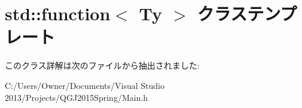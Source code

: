 \hypertarget{classstd_1_1function}{}\section{std\+:\+:function$<$ Ty $>$ クラステンプレート}
\label{classstd_1_1function}


このクラス詳解は次のファイルから抽出されました\+:\begin{DoxyCompactItemize}
\item 
C\+:/\+Users/\+Owner/\+Documents/\+Visual Studio 2013/\+Projects/\+Q\+G\+J2015\+Spring/Main.\+h\end{DoxyCompactItemize}
